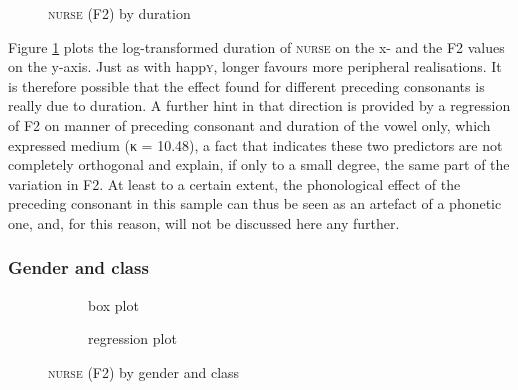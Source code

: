 \begin{figure}[h!]
	\centering
		\resizebox{0.5\linewidth}{!}{} 
	\caption{\textsc{nurse} (F2) by duration}
	\label{fig.scatter.f2w.nurse.dur}
\end{figure}

Figure \ref{fig.scatter.f2w.nurse.dur} plots the log-transformed duration of \textsc{nurse} on the x- and the F2 values on the y-axis.
Just as with happ\textsc{y}, longer  favours more peripheral realisations.
It is therefore possible that the effect found for different preceding consonants is really due to duration.
A further hint in that direction is provided by a regression of F2 on manner of preceding consonant and duration of the vowel only, which expressed medium  (κ = 10.48), a fact that indicates these two predictors are not completely orthogonal and explain, if only to a small degree, the same part of the variation in F2.
At least to a certain extent, the phonological effect of the preceding consonant in this sample can thus be seen as an artefact of a phonetic one, and, for this reason, will not be discussed here any further.

\subsubsection{Gender and class}
\label{sec.prod.res.vow.nurse.f2.genderclass}

\begin{figure}[h!]
	\centering
	\begin{subfigure}{.49\textwidth}
		\centering
			\resizebox{\linewidth}{!}{} 
		\caption{box plot}
		\label{fig.box.f2w.nurse.genderclass}
	\end{subfigure}
	\begin{subfigure}{.49\textwidth}
		\centering
			\resizebox{\linewidth}{!}{} 
		\caption{regression plot}
		\label{fig.scatter.f2w.nurse.genderclass}
	\end{subfigure}
	\caption{\textsc{nurse} (F2) by gender and class}
\end{figure}


